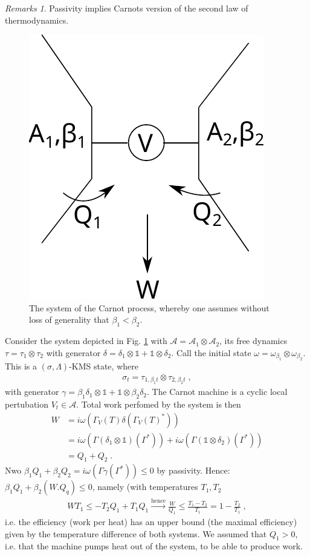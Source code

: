 \documentclass[
a4paper, %
11pt, %
onecolumn, %
openany, %
]{memoir}
\theoremstyle{definition}
\theoremstyle{remark}
\newtheorem{remarks}[definition]{Remarks}
\theoremstyle{plain}
\begin{document}
\begin{remarks}
Passivity implies Carnots version of the second law of thermodynamics. 
\begin{figure}
\centering
\includegraphics[scale=1]{carnot.pdf}
\caption{The system of the Carnot process, whereby one assumes without loss of generality that $\beta_1<\beta_2$.\label{fig::carnot}}
\end{figure}
Consider the system depicted in Fig. \ref{fig::carnot} with $\mathcal{A}=\mathcal{A}_1\otimes \mathcal{A}_2$, its free dynamics $\tau=\tau_1\otimes\tau_2$ with generator $\delta=\delta_1\otimes\mathds{1}+\mathds{1}\otimes\delta_2$. Call the initial state $\omega=\omega_{\beta_1}\otimes\omega_{\beta_2}$. This is a $(\sigma, \Lambda)$-KMS state, where\begin{align}
\sigma_t=\tau_{1,\beta_1t}\otimes \tau_{2,\beta_2t}\; ,
\end{align}
with generator $\gamma=\beta_1\delta_1\otimes\mathds{1}+\mathds{1}\otimes \beta_2\delta_2$. The Carnot machine is a cyclic local pertubation $V_t\in \mathcal{A}$. Total work perfomed by the system is then \begin{align}
W&=i\omega(\Gamma_V(T)\delta(\Gamma_V(T)^*))\\
&=i\omega(\Gamma(\delta_1\otimes\mathds{1})(\Gamma^*))+i\omega(\Gamma(\mathds{1}\otimes\delta_2)(\Gamma^*))\\
&=Q_1+Q_2\;.
\end{align}
Nwo $\beta_1 Q_1+\beta_2Q_2=i\omega(\Gamma\gamma(\Gamma^*))\leq 0$ by passivity. Hence: $\beta_1 Q_1+\beta_2(W.Q_q)\leq 0$, namely (with temperatures $T_1,T_2$\begin{align}
WT_1\leq -T_2Q_1+T_1Q_1 \overset{\text{hence}}{\longrightarrow} \frac{W}{Q_1}\leq \frac{T_1-T_2}{T_1}=1-\frac{T_2}{T_1}\; ,
\end{align}
i.e. the efficiency (work per heat) has an upper bound (the maximal efficiency) given by the temperature difference of both systems. We assumed that $Q_1>0$, i.e. that the machine pumps heat out of the system, to be able to produce work.
\end{remarks}
\end{document}
